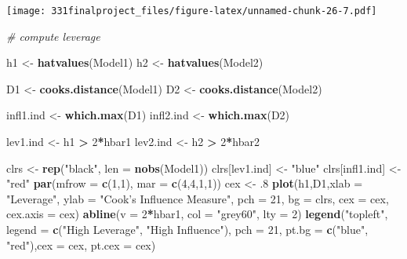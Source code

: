 \documentclass[]{article}
\newenvironment{Shaded}{\begin{snugshade}}{\end{snugshade}}
\newcommand{\KeywordTok}[1]{\textcolor[rgb]{0.13,0.29,0.53}{\textbf{#1}}}
\newcommand{\DataTypeTok}[1]{\textcolor[rgb]{0.13,0.29,0.53}{#1}}
\newcommand{\DecValTok}[1]{\textcolor[rgb]{0.00,0.00,0.81}{#1}}
\newcommand{\StringTok}[1]{\textcolor[rgb]{0.31,0.60,0.02}{#1}}
\newcommand{\CommentTok}[1]{\textcolor[rgb]{0.56,0.35,0.01}{\textit{#1}}}
\newcommand{\OperatorTok}[1]{\textcolor[rgb]{0.81,0.36,0.00}{\textbf{#1}}}
\newcommand{\NormalTok}[1]{#1}
\begin{document}
\texttt{[image: 331finalproject\_files/figure-latex/unnamed-chunk-26-7.pdf]}

\begin{Shaded}
\begin{Highlighting}[]
\CommentTok{# compute leverage}

\NormalTok{h1 <-}\StringTok{ }\KeywordTok{hatvalues}\NormalTok{(Model1)}
\NormalTok{h2 <-}\StringTok{ }\KeywordTok{hatvalues}\NormalTok{(Model2)}

\NormalTok{D1 <-}\StringTok{ }\KeywordTok{cooks.distance}\NormalTok{(Model1)}
\NormalTok{D2 <-}\StringTok{ }\KeywordTok{cooks.distance}\NormalTok{(Model2)}

\NormalTok{infl1.ind <-}\StringTok{ }\KeywordTok{which.max}\NormalTok{(D1)}
\NormalTok{infl2.ind <-}\StringTok{ }\KeywordTok{which.max}\NormalTok{(D2)}

\NormalTok{lev1.ind <-}\StringTok{ }\NormalTok{h1 }\OperatorTok{>}\StringTok{ }\DecValTok{2}\OperatorTok{*}\NormalTok{hbar1}
\NormalTok{lev2.ind <-}\StringTok{ }\NormalTok{h2 }\OperatorTok{>}\StringTok{ }\DecValTok{2}\OperatorTok{*}\NormalTok{hbar2}

\NormalTok{clrs <-}\StringTok{ }\KeywordTok{rep}\NormalTok{(}\StringTok{"black"}\NormalTok{, }\DataTypeTok{len =} \KeywordTok{nobs}\NormalTok{(Model1))}
\NormalTok{clrs[lev1.ind] <-}\StringTok{ "blue"}
\NormalTok{clrs[infl1.ind] <-}\StringTok{"red"}
\KeywordTok{par}\NormalTok{(}\DataTypeTok{mfrow =} \KeywordTok{c}\NormalTok{(}\DecValTok{1}\NormalTok{,}\DecValTok{1}\NormalTok{), }\DataTypeTok{mar =} \KeywordTok{c}\NormalTok{(}\DecValTok{4}\NormalTok{,}\DecValTok{4}\NormalTok{,}\DecValTok{1}\NormalTok{,}\DecValTok{1}\NormalTok{))}
\NormalTok{cex <-}\StringTok{ }\NormalTok{.}\DecValTok{8}
\KeywordTok{plot}\NormalTok{(h1,D1,}\DataTypeTok{xlab =} \StringTok{"Leverage"}\NormalTok{, }\DataTypeTok{ylab =} \StringTok{"Cook's Influence Measure"}\NormalTok{, }\DataTypeTok{pch =} \DecValTok{21}\NormalTok{, }\DataTypeTok{bg =}\NormalTok{ clrs, }\DataTypeTok{cex =}\NormalTok{ cex, }\DataTypeTok{cex.axis =}\NormalTok{ cex)}
\KeywordTok{abline}\NormalTok{(}\DataTypeTok{v =} \DecValTok{2}\OperatorTok{*}\NormalTok{hbar1, }\DataTypeTok{col =} \StringTok{"grey60"}\NormalTok{, }\DataTypeTok{lty =} \DecValTok{2}\NormalTok{)}
\KeywordTok{legend}\NormalTok{(}\StringTok{"topleft"}\NormalTok{, }\DataTypeTok{legend =} \KeywordTok{c}\NormalTok{(}\StringTok{"High Leverage"}\NormalTok{, }\StringTok{"High Influence"}\NormalTok{), }\DataTypeTok{pch =} \DecValTok{21}\NormalTok{, }\DataTypeTok{pt.bg =} \KeywordTok{c}\NormalTok{(}\StringTok{"blue"}\NormalTok{, }\StringTok{"red"}\NormalTok{),}\DataTypeTok{cex =}\NormalTok{ cex, }\DataTypeTok{pt.cex =}\NormalTok{ cex)}
\end{Highlighting}
\end{Shaded}
\end{document}
